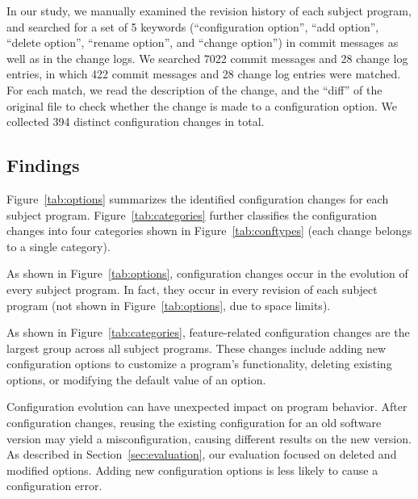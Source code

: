 In our study, %
we manually examined the revision history of each subject program,
and searched for a set of 5 keywords (``configuration option'',
``add option'', ``delete option'', ``rename option'', and ``change option'')
in commit messages as well as in the change logs.
We searched 7022 commit messages and 28 change log entries, in
which 422 commit messages and 28 change log entries were matched.
For each match, we read the description of the change,
and the ``diff'' of the original file to check whether
the change is made to a configuration option. We collected
394 distinct configuration changes in total.




\subsection{Findings}

Figure~\ref{tab:options} summarizes the identified
configuration changes for each subject program.
Figure~\ref{tab:categories} further classifies the
configuration changes into four categories shown
in Figure~\ref{tab:conftypes} (each change belongs to a single category).


As shown in Figure~\ref{tab:options}, configuration changes occur
in the evolution of every subject program. In fact, they occur in
every revision of each subject program (not shown in Figure~\ref{tab:options},
due to space limits).  

As shown in Figure~\ref{tab:categories},
feature-related configuration changes are the largest group across
all subject programs. These changes include
adding new configuration options to customize a program's
functionality, deleting existing options, or modifying the default
value of an option. 

Configuration evolution can have unexpected impact on
program behavior. After configuration changes, reusing
the existing configuration for an old software version
may yield a misconfiguration, causing different results
on the new version.  As described in Section~\ref{sec:evaluation},
our evaluation focused on deleted and modified options.
Adding new configuration options is less likely to cause
a configuration error.


